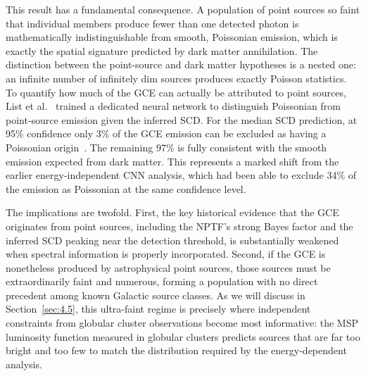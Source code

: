This result has a fundamental consequence.
A population of point sources so faint that individual members produce fewer than one detected photon is mathematically indistinguishable from smooth, Poissonian emission, which is exactly the spatial signature predicted by dark matter annihilation.
The distinction between the point-source and dark matter hypotheses is a nested one: an infinite number of infinitely dim sources produces exactly Poisson statistics.
To quantify how much of the GCE can actually be attributed to point sources, List et al.
\ trained a dedicated neural network to distinguish Poissonian from point-source emission given the inferred SCD.
For the median SCD prediction, at 95\% confidence only 3\% of the GCE emission can be excluded as having a Poissonian origin~\cite{List:2025qbx}.
The remaining 97\% is fully consistent with the smooth emission expected from dark matter.
This represents a marked shift from the earlier energy-independent CNN analysis, which had been able to exclude 34\% of the emission as Poissonian at the same confidence level.

The implications are twofold.
First, the key historical evidence that the GCE originates from point sources, including the NPTF's strong Bayes factor and the inferred SCD peaking near the detection threshold, is substantially weakened when spectral information is properly incorporated.
Second, if the GCE is nonetheless produced by astrophysical point sources, those sources must be extraordinarily faint and numerous, forming a population with no direct precedent among known Galactic source classes.
As we will discuss in Section~\ref{sec:4.5}, this ultra-faint regime is precisely where independent constraints from globular cluster observations become most informative: the MSP luminosity function measured in globular clusters predicts sources that are far too bright and too few to match the distribution required by the energy-dependent analysis.
